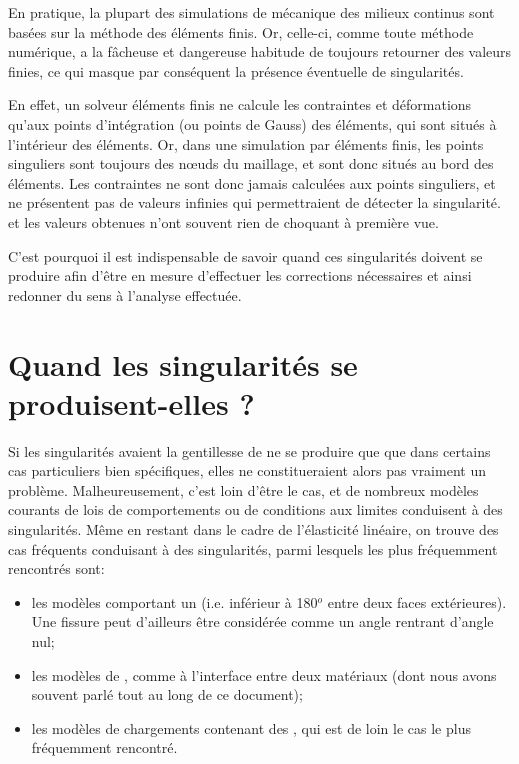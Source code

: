 \medskip
En pratique, la plupart des simulations de mécanique des milieux continus sont basées sur la
méthode des éléments finis. Or, celle-ci, comme toute méthode numérique, a la fâcheuse
et dangereuse habitude de toujours retourner des valeurs finies, ce qui masque par conséquent la présence
éventuelle de singularités.

\medskip
En effet, un solveur éléments finis ne calcule les contraintes et déformations qu'aux points
d'intégration (ou points de Gauss) des éléments, qui sont situés à l'intérieur des éléments.
Or, dans une simulation par éléments finis, les points singuliers sont toujours des nœuds du
maillage, et sont donc situés au bord des éléments. Les contraintes ne sont donc jamais
calculées aux points singuliers, et ne présentent pas de valeurs infinies qui permettraient de
détecter la singularité.  et les valeurs obtenues n'ont souvent rien de choquant à première
vue.

C'est pourquoi il est indispensable de savoir quand ces singularités doivent se produire
afin d'être en mesure d'effectuer les corrections nécessaires et ainsi redonner du
sens à l'analyse effectuée.


\medskip
\section{Quand les singularités se produisent-elles ?}

Si les singularités avaient la gentillesse de ne se produire que que dans certains cas particuliers
bien spécifiques, elles ne constitueraient alors pas vraiment un problème.
Malheureusement, c'est loin d'être le cas, et de nombreux modèles courants de
lois de comportements ou de conditions aux limites conduisent à des singularités.
Même en restant dans le cadre de l'élasticité linéaire, on trouve des cas fréquents
conduisant à des singularités, parmi lesquels les plus fréquemment rencontrés sont:
\medskip
\begin{itemize}
  \item les modèles comportant un  (i.e. inférieur à
	180$^o$ entre deux faces extérieures). Une fissure peut d'ailleurs être considérée
	comme un angle rentrant d'angle nul;

  \item les modèles de , comme à
	l'interface entre deux matériaux (dont nous avons souvent parlé tout au long de ce
	document);
  \item les modèles de chargements contenant des , qui est
	de loin le cas le plus fréquemment rencontré.
\end{itemize}

